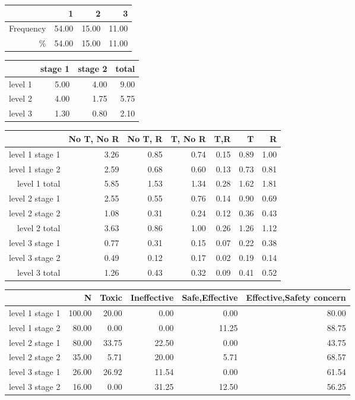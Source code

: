 \documentclass[]{article}
\begin{document}
\begin{table}[ht]
\centering
\begin{tabular}{rrrr}
  \hline
 & 1 & 2 & 3 \\ 
  \hline
Frequency & 54.00 & 15.00 & 11.00 \\ 
  \% & 54.00 & 15.00 & 11.00 \\ 
   \hline
\end{tabular}
\end{table}
\begin{table}[ht]
\centering
\begin{tabular}{rrrr}
  \hline
 & stage 1 & stage 2 & total \\ 
  \hline
level 1 & 5.00 & 4.00 & 9.00 \\ 
  level 2 & 4.00 & 1.75 & 5.75 \\ 
  level 3 & 1.30 & 0.80 & 2.10 \\ 
   \hline
\end{tabular}
\end{table}
\begin{table}[ht]
\centering
\begin{tabular}{rrrrrrr}
  \hline
 & No T, No R & No T, R & T, No R & T,R & T & R \\ 
  \hline
level 1 stage 1 & 3.26 & 0.85 & 0.74 & 0.15 & 0.89 & 1.00 \\ 
  level 1 stage 2 & 2.59 & 0.68 & 0.60 & 0.13 & 0.73 & 0.81 \\ 
  level 1 total & 5.85 & 1.53 & 1.34 & 0.28 & 1.62 & 1.81 \\ 
  level 2 stage 1 & 2.55 & 0.55 & 0.76 & 0.14 & 0.90 & 0.69 \\ 
  level 2 stage 2 & 1.08 & 0.31 & 0.24 & 0.12 & 0.36 & 0.43 \\ 
  level 2 total & 3.63 & 0.86 & 1.00 & 0.26 & 1.26 & 1.12 \\ 
  level 3 stage 1 & 0.77 & 0.31 & 0.15 & 0.07 & 0.22 & 0.38 \\ 
  level 3 stage 2 & 0.49 & 0.12 & 0.17 & 0.02 & 0.19 & 0.14 \\ 
  level 3 total & 1.26 & 0.43 & 0.32 & 0.09 & 0.41 & 0.52 \\ 
   \hline
\end{tabular}
\end{table}
\begin{table}[ht]
\centering
\begin{tabular}{rrrrrr}
  \hline
 & N & Toxic & Ineffective & Safe,Effective & Effective,Safety concern \\ 
  \hline
level 1 stage 1 & 100.00 & 20.00 & 0.00 & 0.00 & 80.00 \\ 
  level 1 stage 2 & 80.00 & 0.00 & 0.00 & 11.25 & 88.75 \\ 
  level 2 stage 1 & 80.00 & 33.75 & 22.50 & 0.00 & 43.75 \\ 
  level 2 stage 2 & 35.00 & 5.71 & 20.00 & 5.71 & 68.57 \\ 
  level 3 stage 1 & 26.00 & 26.92 & 11.54 & 0.00 & 61.54 \\ 
  level 3 stage 2 & 16.00 & 0.00 & 31.25 & 12.50 & 56.25 \\ 
   \hline
\end{tabular}
\end{table}
\end{document}
